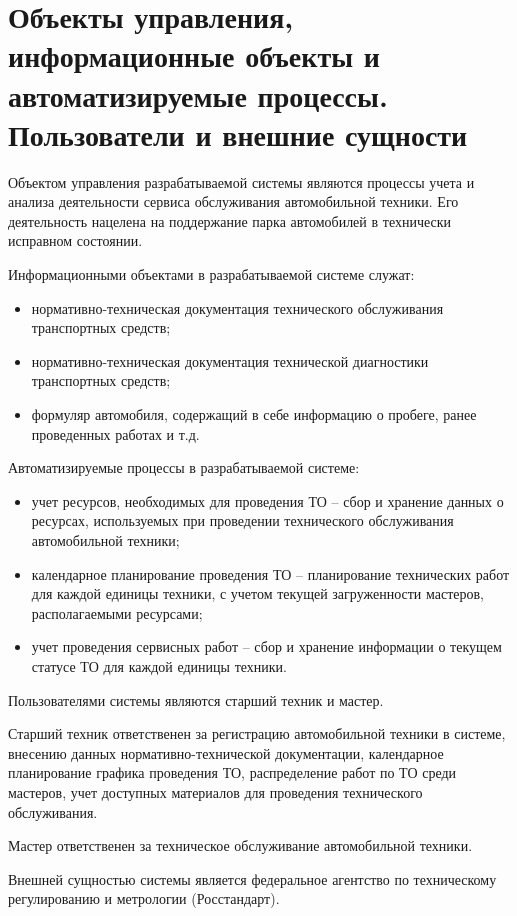 \documentclass[../nirs.tex]{subfiles}
\begin{document}
\section{Объекты управления, информационные объекты и автоматизируемые процессы.
  Пользователи и внешние сущности}
Объектом управления разрабатываемой системы являются процессы учета и анализа
деятельности сервиса обслуживания автомобильной техники.
Его деятельность нацелена на поддержание парка автомобилей в технически
исправном состоянии.

Информационными объектами в разрабатываемой системе служат:
\begin{itemize}
	\item нормативно-техническая документация технического обслуживания
		транспортных средств;
	\item нормативно-техническая документация технической диагностики
		транспортных средств;
	\item формуляр автомобиля, содержащий в себе информацию о пробеге,
		ранее проведенных работах и т.д.
\end{itemize}

Автоматизируемые процессы в разрабатываемой системе:
\begin{itemize}
	\item учет ресурсов, необходимых для проведения ТО -- сбор и хранение данных
		о ресурсах, используемых при проведении технического обслуживания
		автомобильной техники;
	\item календарное планирование проведения ТО -- планирование технических
		работ для каждой единицы техники, с учетом текущей загруженности
		мастеров, располагаемыми ресурсами;
	\item учет проведения сервисных работ -- сбор и хранение информации о
		текущем статусе ТО для каждой единицы техники.
\end{itemize}

Пользователями системы являются старший техник и мастер.

Старший техник ответственен за регистрацию автомобильной техники в системе,
внесению данных нормативно-технической документации, календарное планирование
графика проведения ТО, распределение работ по ТО среди мастеров, учет доступных
материалов для проведения технического обслуживания.

Мастер ответственен за техническое обслуживание автомобильной техники.

Внешней сущностью системы является федеральное агентство по техническому
регулированию и метрологии (Росстандарт).
\end{document}
